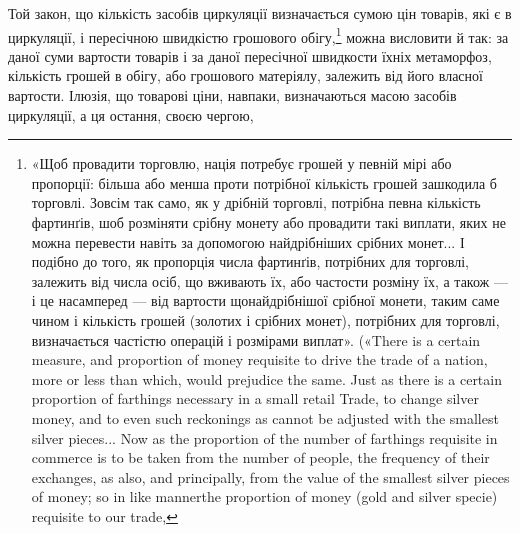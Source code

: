 Той закон, що кількість засобів циркуляції визначається
сумою цін товарів, які є в циркуляції, і пересічною швидкістю
грошового обігу,\footnote{
«Щоб провадити торговлю, нація потребує грошей у певній мірі
або пропорції: більша або менша проти потрібної кількість грошей зашкодила
б торговлі. Зовсім так само, як у дрібній торговлі, потрібна певна
кількість фартинґів, шоб розміняти срібну монету або провадити такі
виплати, яких не можна перевести навіть за допомогою найдрібніших
срібних монет... І подібно до того, як пропорція числа фартинґів, потрібних
для торговлі, залежить від числа осіб, що вживають їх, або частости
розміну їх, а також — і це насамперед — від вартости щонайдрібнішої
срібної монети, таким саме чином і кількість грошей (золотих і срібних
монет), потрібних для торговлі, визначається частістю операцій і розмірами
виплат». («There is a certain measure, and proportion of money requisite
to drive the trade of a nation, more or less than which, would prejudice
the same. Just as there is a certain proportion of farthings necessary in a
small retail Trade, to change silver money, and to even such reckonings
as cannot be adjusted with the smallest silver pieces... Now as the proportion
of the number of farthings requisite in commerce is to be taken from
the number of people, the frequency of their exchanges, as also, and principally,
from the value of the smallest silver pieces of money; so in like mannerthe
proportion of money (gold and silver specie) requisite to our trade,
} можна висловити й так: за даної суми вартости
товарів і за даної пересічної швидкости їхніх метаморфоз,
кількість грошей в обігу, або грошового матеріялу, залежить від
його власної вартости. Ілюзія, що товарові ціни, навпаки, визначаються
масою засобів циркуляції, а ця остання, своєю чергою,
